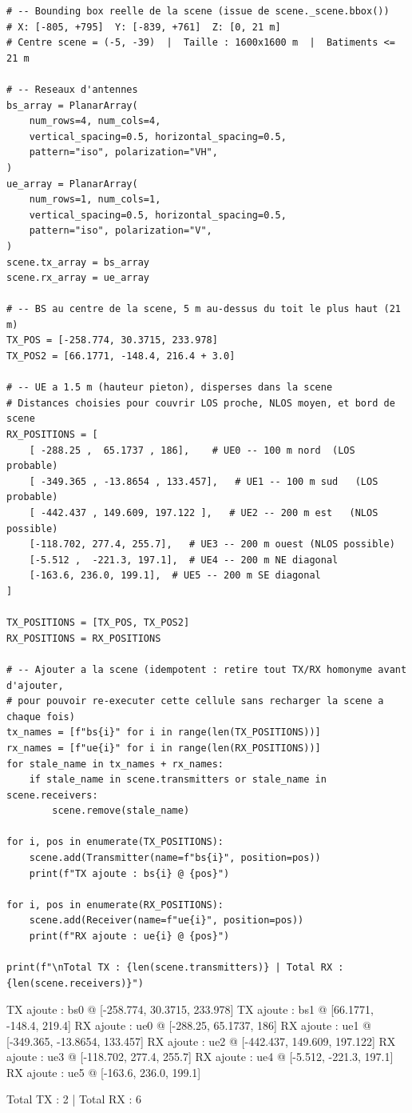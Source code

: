 \documentclass[11pt,a4paper]{article}
\begin{document}
\begin{lstlisting}
# -- Bounding box reelle de la scene (issue de scene._scene.bbox())
# X: [-805, +795]  Y: [-839, +761]  Z: [0, 21 m]
# Centre scene = (-5, -39)  |  Taille : 1600x1600 m  |  Batiments <= 21 m

# -- Reseaux d'antennes
bs_array = PlanarArray(
    num_rows=4, num_cols=4,
    vertical_spacing=0.5, horizontal_spacing=0.5,
    pattern="iso", polarization="VH",
)
ue_array = PlanarArray(
    num_rows=1, num_cols=1,
    vertical_spacing=0.5, horizontal_spacing=0.5,
    pattern="iso", polarization="V",
)
scene.tx_array = bs_array
scene.rx_array = ue_array

# -- BS au centre de la scene, 5 m au-dessus du toit le plus haut (21 m)
TX_POS = [-258.774, 30.3715, 233.978]
TX_POS2 = [66.1771, -148.4, 216.4 + 3.0]

# -- UE a 1.5 m (hauteur pieton), disperses dans la scene
# Distances choisies pour couvrir LOS proche, NLOS moyen, et bord de scene
RX_POSITIONS = [
    [ -288.25 ,  65.1737 , 186],    # UE0 -- 100 m nord  (LOS probable)
    [ -349.365 , -13.8654 , 133.457],   # UE1 -- 100 m sud   (LOS probable)
    [ -442.437 , 149.609, 197.122 ],   # UE2 -- 200 m est   (NLOS possible)
    [-118.702, 277.4, 255.7],   # UE3 -- 200 m ouest (NLOS possible)
    [-5.512 ,  -221.3, 197.1],  # UE4 -- 200 m NE diagonal
    [-163.6, 236.0, 199.1],  # UE5 -- 200 m SE diagonal
]

TX_POSITIONS = [TX_POS, TX_POS2]
RX_POSITIONS = RX_POSITIONS

# -- Ajouter a la scene (idempotent : retire tout TX/RX homonyme avant d'ajouter,
# pour pouvoir re-executer cette cellule sans recharger la scene a chaque fois)
tx_names = [f"bs{i}" for i in range(len(TX_POSITIONS))]
rx_names = [f"ue{i}" for i in range(len(RX_POSITIONS))]
for stale_name in tx_names + rx_names:
    if stale_name in scene.transmitters or stale_name in scene.receivers:
        scene.remove(stale_name)

for i, pos in enumerate(TX_POSITIONS):
    scene.add(Transmitter(name=f"bs{i}", position=pos))
    print(f"TX ajoute : bs{i} @ {pos}")

for i, pos in enumerate(RX_POSITIONS):
    scene.add(Receiver(name=f"ue{i}", position=pos))
    print(f"RX ajoute : ue{i} @ {pos}")

print(f"\nTotal TX : {len(scene.transmitters)} | Total RX : {len(scene.receivers)}")
\end{lstlisting}

\begin{consoleout}
TX ajoute : bs0 @ [-258.774, 30.3715, 233.978]
TX ajoute : bs1 @ [66.1771, -148.4, 219.4]
RX ajoute : ue0 @ [-288.25, 65.1737, 186]
RX ajoute : ue1 @ [-349.365, -13.8654, 133.457]
RX ajoute : ue2 @ [-442.437, 149.609, 197.122]
RX ajoute : ue3 @ [-118.702, 277.4, 255.7]
RX ajoute : ue4 @ [-5.512, -221.3, 197.1]
RX ajoute : ue5 @ [-163.6, 236.0, 199.1]

Total TX : 2 | Total RX : 6
\end{consoleout}
\end{document}
